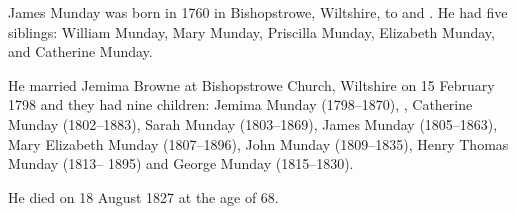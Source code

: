 
James Munday was born in 1760 in Bishopstrowe, Wiltshire, to  and .
He had five siblings:
William Munday, Mary Munday, Priscilla Munday, Elizabeth Munday, and Catherine Munday.

He married Jemima Browne at Bishopstrowe Church, Wiltshire on 15 February 1798 and they had nine children: Jemima Munday (1798--1870), ,
Catherine Munday (1802--1883), Sarah Munday (1803--1869),
James Munday (1805--1863), Mary Elizabeth Munday (1807--1896), John Munday (1809--1835), Henry Thomas Munday (1813-- 1895) and George Munday (1815--1830).

He died on 18 August 1827 at the age of 68.
